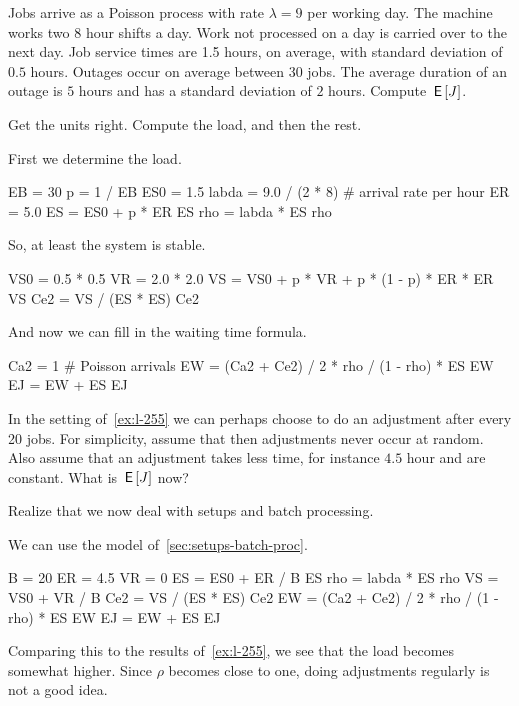 \begin{exercise}\label{ex:l-255}
 Jobs
arrive as a Poisson process with rate $\lambda=9$ per working day.
 The machine works two $8$ hour shifts a day.
 Work not processed on a day is carried over to the next day.
 Job service times are 1.5 hours, on average, with standard deviation of $0.5$ hours.
 Outages occur on average between $30$ jobs.
The average duration of an outage  is $5$ hours and has a standard deviation of $2$ hours.
 Compute $\,\mathsf{E}\left[J\right]$.
\begin{hint}
 Get the units right.  Compute the load, and then the rest.
\end{hint}
\begin{solution}
First we determine the load.
\begin{pyconsole}
EB = 30
p = 1 / EB
ES0 = 1.5
labda = 9.0 / (2 * 8)  # arrival rate per hour
ER = 5.0
ES = ES0 + p * ER
ES
rho = labda * ES
rho
\end{pyconsole}
So, at least the system is stable.
\begin{pyconsole}
VS0 = 0.5 * 0.5
VR = 2.0 * 2.0
VS = VS0 + p * VR + p * (1 - p) * ER * ER
VS
Ce2 = VS / (ES * ES)
Ce2
\end{pyconsole}
And now we can fill in the waiting time formula.
\begin{pyconsole}
Ca2 = 1  # Poisson arrivals
EW = (Ca2 + Ce2) / 2 * rho / (1 - rho) * ES
EW
EJ = EW + ES
EJ
\end{pyconsole}
\end{solution}
\end{exercise}


\begin{exercise}\label{ex:104}
In the setting of~\cref{ex:l-255} we can perhaps choose to do an adjustment after every 20 jobs.
For simplicity, assume that then adjustments never occur at random.
Also assume that an adjustment takes less time, for instance $4.5$ hour and are constant.
What is $\,\mathsf{E}\left[J\right]$ now?
\begin{hint}
Realize that we now deal with setups and batch processing.
\end{hint}
\begin{solution}
We can use the model of~\cref{sec:setups-batch-proc}.
\begin{pyconsole}
B = 20
ER = 4.5
VR = 0
ES = ES0 + ER / B
ES
rho = labda * ES
rho
VS = VS0 + VR / B
Ce2 = VS / (ES * ES)
Ce2
EW = (Ca2 + Ce2) / 2 * rho / (1 - rho) * ES
EW
EJ = EW + ES
EJ
\end{pyconsole}
Comparing this to the results of~\cref{ex:l-255}, we see that the load becomes somewhat higher. Since $\rho$ becomes close to one, doing adjustments regularly is not a good idea.
\end{solution}
\end{exercise}


